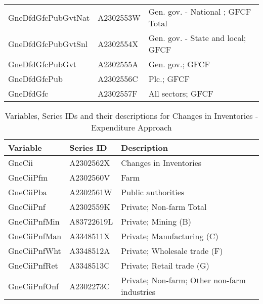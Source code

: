 {\begin{table}
\begin{tabular*}{\columnwidth}[width = \textwidth]{lll}
		\addlinespace
    GneDfdGfcPubGvtNat    & A2302553W & Gen. gov. - National ; GFCF Total\\
    GneDfdGfcPubGvtSnl    & A2302554X & Gen. gov. - State and local; GFCF\\
    GneDfdGfcPubGvt       & A2302555A & Gen. gov.; GFCF\\
    GneDfdGfcPub          & A2302556C & Plc.; GFCF\\
    GneDfdGfc             & A2302557F & All sectors; GFCF\\
		\bottomrule
	\end{tabular*}
	\label{Tab:Expenditure-hierarchy-1}
\end{table}

\begin{table}[h]
	\caption{Variables, Series IDs and their descriptions for Changes in Inventories - Expenditure Approach}
	\small
	\centering
	\begin{tabular*}{\columnwidth}[width = \textwidth]{lll}
		\toprule
		\textbf{Variable} & \textbf{Series ID} & \textbf{Description}\\
		\midrule
    GneCii       & A2302562X  & Changes in Inventories\\
    GneCiiPfm    & A2302560V  & Farm\\
    GneCiiPba    & A2302561W  & Public authorities\\
    GneCiiPnf    & A2302559K  & Private; Non-farm Total\\
    GneCiiPnfMin & A83722619L & Private; Mining (B)\\
		\addlinespace
    GneCiiPnfMan & A3348511X  & Private; Manufacturing (C)\\
    GneCiiPnfWht & A3348512A  & Private; Wholesale trade (F)\\
    GneCiiPnfRet & A3348513C  & Private; Retail trade (G)\\
    GneCiiPnfOnf & A2302273C  & Private; Non-farm; Other non-farm industries\\
		\bottomrule
	\end{tabular*}
	\label{Tab:Expenditure-hierarchy-2}
\end{table}

}
